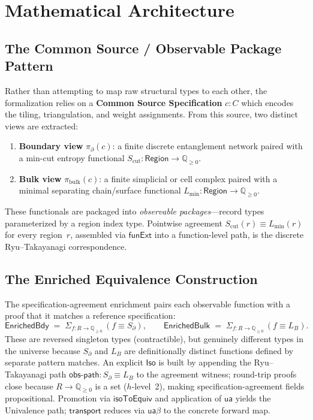 \documentclass[11pt, a4paper]{article}
\theoremstyle{plain}
\theoremstyle{definition}
\newcommand{\RT}{Ryu--Takayanagi}
\newcommand{\ua}{\mathsf{ua}}
\newcommand{\transport}{\mathsf{transport}}
\newcommand{\funExt}{\mathsf{funExt}}
\newcommand{\isoToEquiv}{\mathsf{isoToEquiv}}
\newcommand{\Qgeq}{\mathbb{Q}_{\geq 0}}
\newcommand{\Scut}{S_{\mathrm{cut}}}
\newcommand{\Lmin}{L_{\mathrm{min}}}
\begin{document}
\section{Mathematical Architecture}
\label{sec:architecture}

\subsection{The Common Source / Observable Package Pattern}

Rather than attempting to map raw structural types to each other,
the formalization relies on a \textbf{Common Source Specification}
$c : C$ which encodes the tiling, triangulation, and weight
assignments.  From this source, two distinct views are extracted:

\begin{enumerate}[nosep]
  \item \textbf{Boundary view} $\pi_\partial(c)$: a finite discrete
    entanglement network paired with a min-cut entropy functional
    $\Scut : \mathsf{Region} \to \Qgeq$.
  \item \textbf{Bulk view} $\pi_{\mathrm{bulk}}(c)$: a finite
    simplicial or cell complex paired with a minimal separating
    chain/surface functional $\Lmin : \mathsf{Region} \to \Qgeq$.
\end{enumerate}

These functionals are packaged into \emph{observable packages}---record types parameterized by a region index type.  Pointwise agreement
$\Scut(r) \equiv \Lmin(r)$ for every region~$r$, assembled via
$\funExt$ into a function-level path, is the discrete \RT{}
correspondence.

\subsection{The Enriched Equivalence Construction}

The specification-agreement enrichment pairs each observable
function with a proof that it matches a reference specification:
\[
  \mathsf{EnrichedBdy} \;=\; \Sigma_{f : R \to \Qgeq}\,(f \equiv S_\partial),
  \qquad
  \mathsf{EnrichedBulk} \;=\; \Sigma_{f : R \to \Qgeq}\,(f \equiv L_B).
\]
These are reversed singleton types (contractible), but genuinely
different types in the universe because $S_\partial$ and $L_B$ are
definitionally distinct functions defined by separate pattern
matches.  An explicit $\mathsf{Iso}$ is built by appending the
\RT{} path $\mathsf{obs\text{-}path} : S_\partial \equiv L_B$ to
the agreement witness; round-trip proofs close because $R \to \Qgeq$
is a set ($h$-level~2), making specification-agreement fields
propositional. Promotion via $\isoToEquiv$ and application of
$\ua$ yields the Univalence path; $\transport$ reduces via
$\mathsf{ua}\beta$ to the concrete forward map.
\end{document}
